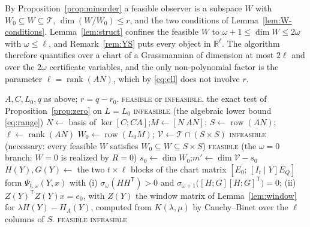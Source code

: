 \documentclass[journal]{IEEEtran}
\theoremstyle{plainn}
\theoremstyle{remark}
\begin{document}
By Proposition~\ref{prop:minorder} a feasible observer is a subspace $W$ with
$W_0\subseteq W\subseteq\mathcal T$, $\dim(W/W_0)\le r$, and the two conditions of
Lemma~\ref{lem:W-conditions}. Lemma~\ref{lem:struct} confines the feasible $W$ to
$\omega+1\le\dim W\le2\omega$ with $\omega\le\ell$, and Remark~\ref{rem:YS} puts every object in
$\mathbb R^\ell$. The algorithm therefore quantifies over a chart of a Grassmannian of dimension
at most $2\ell$ and over the $2\omega$ certificate variables, and the only non-polynomial factor
is the parameter $\ell=\operatorname{rank}(AN)$, which by \eqref{eq:ell} does not involve $r$.

\begin{algorithm}[!t]
\caption{Deciding $\mathrm{DEC}(q)$ in time $f(\ell)\operatorname{poly}(\mathcal L)$}
\label{alg:fpt}
\begin{algorithmic}[1]
\Require $A,C,L_0,q$ as above; $r=q-r_0$.
\Ensure \textsc{feasible} or \textsc{infeasible}.
  \State \Return the exact test of Proposition~\ref{prop:zero} on $L=L_0$
\EndIf
{}
  \State \Return \textsc{infeasible}
  \Statex \quad \textup{(the algebraic lower bound \eqref{eq:range})}
\EndIf
\State $N\gets$ basis of $\ker[C;CA]$;\quad $M\gets[N\ AN]$;\quad
$S\gets\operatorname{row}(AN)$;\quad $\ell\gets\operatorname{rank}(AN)$
\State $W_0\gets\operatorname{row}(L_0M)$;\quad
$\mathcal V\gets\mathcal T\cap(S\times S)$
  \State \Return \textsc{infeasible}
  \Statex \quad \textup{(necessary: every feasible $W$ satisfies $W_0\subseteq W\subseteq S\times S$)}
\EndIf
{}
  \State \Return \textsc{feasible}
  \Statex \quad \textup{(the $\omega=0$ branch: $W=0$ is realized by $R=0$)}
\EndIf
\State $s_0\gets\dim W_0$;\quad $m'\gets\dim\mathcal V-s_0$
    \State $H(Y),G(Y)\gets$ the two $t\times\ell$ blocks of the chart matrix
             $[E_0;\,[I_t\mid Y]E_Q]$
      \State form $\Psi_{t,\omega}(Y,x)$ with
      \Statex \quad (i) $\sigma_\omega(HH^{\mathsf T})>0$ and
               $\sigma_{\omega+1}\bigl([H;G][H;G]^{\mathsf T}\bigr)=0$;
      \Statex \quad (ii) $Z(Y)^{\mathsf T}Z(Y)x=e_0$, with $Z(Y)$ the window matrix of
               Lemma~\ref{lem:window} for $\lambda H(Y)-H_A(Y)$, computed from $K(\lambda,\mu)$ by
               Cauchy--Binet over the $\ell$ columns of $S$.
        \State \Return \textsc{feasible}
      \EndIf
    \EndFor
  \EndFor
\EndFor
\State \Return \textsc{infeasible}
\end{algorithmic}
\end{algorithm}
\end{document}

